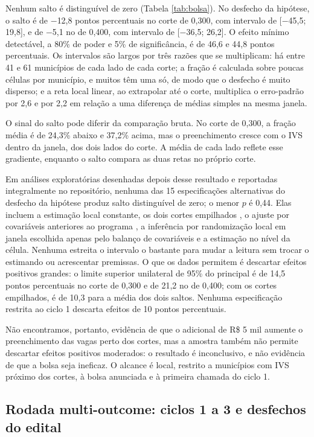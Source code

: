 \documentclass[11pt,a4paper]{article}
\begin{document}
Nenhum salto é distinguível de zero (Tabela \ref{tab:bolsa}). No desfecho da
hipótese, o salto é de $-$12,8 pontos percentuais no corte de 0,300, com
intervalo de [$-$45,5; 19,8], e de $-$5,1 no de 0,400, com intervalo de
[$-$36,5; 26,2]. O efeito mínimo detectável, a 80\% de poder e 5\% de
significância, é de 46,6 e 44,8 pontos percentuais. Os intervalos são largos
por três razões que se multiplicam: há entre 41 e 61 municípios de cada lado de
cada corte; a fração é calculada sobre poucas células por município, e muitos
têm uma só, de modo que o desfecho é muito disperso; e a reta local linear, ao
extrapolar até o corte, multiplica o erro-padrão por 2,6 e por 2,2 em relação a
uma diferença de médias simples na mesma janela.

O sinal do salto pode diferir da comparação bruta. No corte de 0,300, a fração
média é de 24,3\% abaixo e 37,2\% acima, mas o preenchimento cresce com o IVS
dentro da janela, dos dois lados do corte. A média de cada lado reflete esse
gradiente, enquanto o salto compara as duas retas no próprio corte.

Em análises exploratórias desenhadas depois desse resultado e reportadas
integralmente no repositório, nenhuma das 15 especificações alternativas do
desfecho da hipótese produz salto distinguível de zero; o menor $p$ é 0,44.
Elas incluem a estimação local constante, os dois cortes empilhados
\citep{cattaneo2016}, o ajuste por covariáveis anteriores ao programa
\citep{calonico2019}, a inferência por randomização local em janela escolhida
apenas pelo balanço de covariáveis \citep{cattaneo2015} e a estimação no nível
da célula. Nenhuma estreita o intervalo o bastante para mudar a leitura sem
trocar o estimando ou acrescentar premissas. O que os dados permitem é
descartar efeitos positivos grandes: o limite superior unilateral de 95\% do
principal é de 14,5 pontos percentuais no corte de 0,300 e de 21,2 no de
0,400; com os cortes empilhados, é de 10,3 para a média dos dois saltos.
Nenhuma especificação restrita ao ciclo 1 descarta efeitos de 10 pontos
percentuais.

Não encontramos, portanto, evidência de que o adicional de R\$ 5 mil aumente o
preenchimento das vagas perto dos cortes, mas a amostra também não permite
descartar efeitos positivos moderados: o resultado é inconclusivo, e não
evidência de que a bolsa seja ineficaz. O alcance é local, restrito a
municípios com IVS próximo dos cortes, à bolsa anunciada e à primeira chamada
do ciclo 1.

\subsection{Rodada multi-outcome: ciclos 1 a 3 e desfechos do edital}
\label{sec:bolsa_multi}
\end{document}
